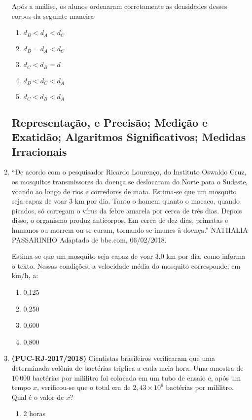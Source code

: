\begin{enumerate}
Após a análise, os alunos ordenaram corretamente as densidades desses corpos da seguinte maneira
\begin{enumerate}
\item {} 
$d_{B} < d_{A} < d_{C}$

\item {} 
$d_{B} = d_{A} < d_{C}$

\item {} 
$d_{C} < d_{B} = d_{}$

\item {} 
$d_{B} < d_{C} < d_{A}$

\item {} 
$d_{C} < d_{B} < d_{A}$

\end{enumerate}

\subsection{Representação, e Precisão; Medição e Exatidão; Algaritmos Significativos; Medidas Irracionais}

\item “De acordo com o pesquisador Ricardo Lourenço, do Instituto Oswaldo Cruz, os mosquitos transmissores da doença se deslocaram do Norte para o Sudeste, voando ao longo de rios e corredores de mata. Estima-se que um mosquito seja capaz de voar 3 km por dia. Tanto o homem quanto o macaco, quando picados, só carregam o vírus da febre amarela por cerca de três dias. Depois disso, o organismo produz anticorpos. Em cerca de dez dias, primatas e humanos ou morrem ou se curam, tornando-se imunes à doença.” NATHALIA PASSARINHO Adaptado de bbc.com, 06/02/2018.

Estima-se que um mosquito seja capaz de voar 3,0 km por dia, como informa o texto.
Nessas condições, a velocidade média do mosquito corresponde, em km/h, a:
\begin{enumerate}
\item {} 
0,125

\item {} 
0,250

\item {} 
0,600

\item {} 
0,800

\end{enumerate}

\item \textbf{(PUC-RJ-2017/2018)} Cientistas brasileiros verificaram que uma determinada colônia de bactérias triplica a cada meia hora. Uma amostra de \(10\,000\) bactérias por mililitro foi colocada em um tubo de ensaio e, após um tempo \(x\), verificou-se que o total era de \(2,43 \times 10^{6}\) bactérias por mililitro. Qual é o valor de \(x\)?
\begin{enumerate}
\item {} 
2 horas


\end{enumerate}
\end{enumerate}
